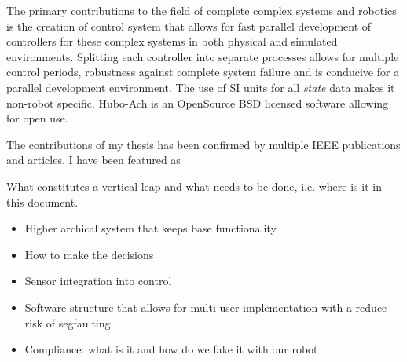 The primary contributions to the field of complete complex systems and robotics is the creation of control system that allows for fast parallel development of controllers for these complex systems in both physical and simulated environments.
Splitting each controller into separate processes allows for multiple control periods, robustness against complete system failure and is conducive for a parallel development environment.
The use of SI units for all \textit{state} data makes it non-robot specific.
Hubo-Ach is an OpenSource BSD licensed software allowing for open use.

The contributions of my thesis has been confirmed by multiple IEEE publications and articles.
I have been featured as 

What constitutes a vertical leap and what needs to be done, i.e. where is it in this document.
\begin{itemize}
\item Higher archical system that keeps base functionality
\item How to make the decisions
\item Sensor integration into control 
\item Software structure that allows for multi-user implementation with a reduce risk of segfaulting 
\item Compliance: what is it and how do we fake it with our robot
\end{itemize}
